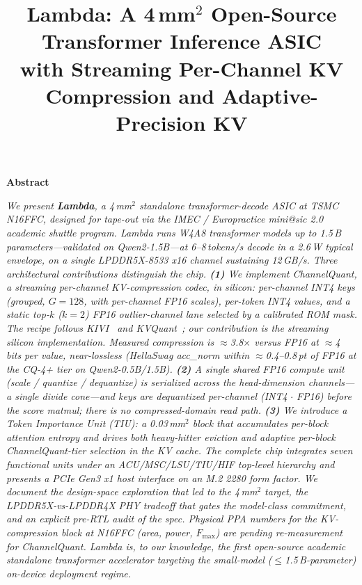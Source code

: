 \documentclass[conference]{IEEEtran}
\renewenvironment{abstract}
  {\par\vspace{4pt}\noindent\begin{center}\textbf{\large Abstract}\end{center}\vspace{-2pt}\par\itshape\small}
  {\par\vspace{6pt}\upshape\normalsize}
\begin{document}
\title{Lambda: A 4\,mm$^2$ Open-Source Transformer Inference ASIC \\ with Streaming Per-Channel KV Compression and Adaptive-Precision KV}

\author{
}

\maketitle

\begin{abstract}
\boldmath
We present \textbf{Lambda}, a 4\,mm$^2$ standalone transformer-decode ASIC at TSMC N16FFC, designed for tape-out via the IMEC / Europractice mini@sic 2.0 academic shuttle program. Lambda runs W4A8 transformer models up to 1.5\,B parameters---validated on Qwen2-1.5B---at 6--8\,tokens/s decode in a 2.6\,W typical envelope, on a single LPDDR5X-8533 x16 channel sustaining 12\,GB/s. Three architectural contributions distinguish the chip. \textbf{(1)} We implement \emph{ChannelQuant}, a streaming per-channel KV-compression codec, in silicon: per-channel INT4 keys (grouped, $G{=}128$, with per-channel FP16 scales), per-token INT4 values, and a static top-$k$ ($k{=}2$) FP16 outlier-channel lane selected by a calibrated ROM mask. The recipe follows KIVI~\cite{kivi} and KVQuant~\cite{kvquant}; our contribution is the streaming silicon implementation. Measured compression is $\approx$3.8$\times$ versus FP16 at $\approx$4 bits per value, near-lossless (HellaSwag acc\_norm within $\approx$0.4--0.8\,pt of FP16 at the CQ-4+ tier on Qwen2-0.5B/1.5B). \textbf{(2)} A single shared FP16 compute unit (scale / quantize / dequantize) is serialized across the head-dimension channels---a single divide cone---and keys are dequantized per-channel (INT4$\,\cdot\,$FP16) \emph{before} the score matmul; there is no compressed-domain read path. \textbf{(3)} We introduce a Token Importance Unit (TIU): a 0.03\,mm$^2$ block that accumulates per-block attention entropy and drives both heavy-hitter eviction and adaptive per-block ChannelQuant-tier selection in the KV cache. The complete chip integrates seven functional units under an ACU/MSC/LSU/TIU/HIF top-level hierarchy and presents a PCIe Gen3 x1 host interface on an M.2 2280 form factor. We document the design-space exploration that led to the 4\,mm$^2$ target, the LPDDR5X-vs-LPDDR4X PHY tradeoff that gates the model-class commitment, and an explicit pre-RTL audit of the spec. Physical PPA numbers for the KV-compression block at N16FFC (area, power, $F_\mathrm{max}$) are pending re-measurement for ChannelQuant. Lambda is, to our knowledge, the first open-source academic standalone transformer accelerator targeting the small-model ($\leq$1.5\,B-parameter) on-device deployment regime.
\unboldmath
\end{abstract}
\end{document}
